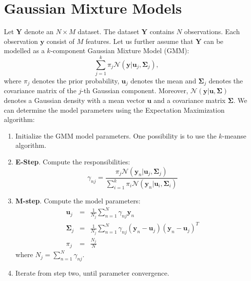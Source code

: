 \documentclass{article}
\begin{document}
\section{Gaussian Mixture Models}
\label{sec:GMM}
Let $\mathbf{Y}$ denote an $N\times M$ dataset. The dataset $\mathbf{Y}$ contains $N$ observations. Each observation $\mathbf{y}$ consist of $M$ features. Let us further assume 
that $\mathbf{Y}$ can be modelled as a $k$-component Gaussian Mixture Model (GMM):
\begin{equation}
\sum_{j=1}^k \pi_j \mathcal{N}(\mathbf{y}|\mathbf{u}_j,\mathbf{\Sigma}_j),
\end{equation}
where $\pi_j$ denotes the prior probability, $\mathbf{u}_j$ denotes the mean and $\mathbf{\Sigma}_j$ denotes the covariance matrix of the $j$-th Gaussian component. Moreover,
$\mathcal{N}(\mathbf{y}|\mathbf{u},\mathbf{\Sigma})$ denotes a Gaussian density with a mean vector $\mathbf{u}$ and a covariance matrix $\mathbf{\Sigma}$.  
We can determine the model parameters using the Expectation Maximization algorithm:
\begin{enumerate}
 \item Initialize the GMM model parameters. One possibility is to use the $k$-meanse algorithm.
 \item \textbf{E-Step}. Compute the responsibilities:
 \begin{equation}
  \gamma_{nj} = \frac{\pi_j\mathcal{N}(\mathbf{y}_n|\mathbf{u}_j,\mathbf{\Sigma}_j)}{\sum_{i=1}^{k}\pi_i\mathcal{N}(\mathbf{y}_n|\mathbf{u}_i,\mathbf{\Sigma}_i)}
 \end{equation}
 \item \textbf{M-step}. Compute the model parameters:
 \begin{eqnarray}
  \mathbf{u}_j &=& \frac{1}{N_j} \sum_{n=1}^{N} \gamma_{nj}\mathbf{y}_n\\
  \mathbf{\Sigma}_j &=& \frac{1}{N_j} \sum_{n=1}^{N} \gamma_{nj} (\mathbf{y}_n-\mathbf{u}_j)(\mathbf{y}_n-\mathbf{u}_j)^T\\
  \pi_j &=& \frac{N_j}{N}
 \end{eqnarray}
 where $N_j = \sum_{n=1}^N \gamma_{nj}$.
 \item Iterate from step two, until parameter convergence.
\end{enumerate}
\end{document}
